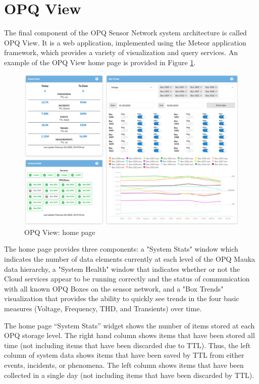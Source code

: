 \section{OPQ View}
\label{sec:opq-view}

The final component of the OPQ Sensor Network system architecture is called OPQ View. It is a web application, implemented using the Meteor application framework, which provides a variety of visualization and query services.  An example of the OPQ View home page is provided in Figure \ref{fig:opq-view-home}.

\begin{figure}
\center \includegraphics[width=5in]{images/view/homepage.png}
\caption{OPQ View: home page}
\label{fig:opq-view-home}
\end{figure}

The home page provides three components:  a "System Stats" window which indicates the number of data elements currently at each level of the OPQ Mauka data hierarchy, a "System Health" window that indicates whether or not the Cloud services appear to be running correctly and the status of communication with all known OPQ Boxes on the sensor network, and a "Box Trends" visualization that provides the ability to quickly see trends in the four basic measures (Voltage, Frequency, THD, and Transients) over time.

The home page ``System Stats'' widget shows the number of items stored at each OPQ storage level. The right hand column shows items that have been stored all time (not including items that have been discarded due to TTL). Thus, the left column of system data shows items that have been saved by TTL from either events, incidents, or phenomena. The left column shows items that have been collected in a single day (not including items that have been discarded by TTL).

